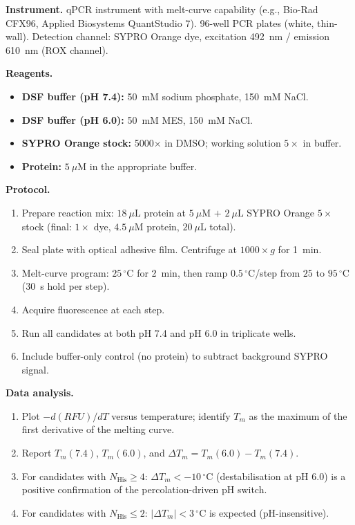 \noindent\textbf{Instrument.}  qPCR instrument with melt-curve capability
(e.g., Bio-Rad CFX96, Applied Biosystems QuantStudio 7).  96-well PCR plates
(white, thin-wall).  Detection channel: SYPRO Orange dye, excitation
492~nm / emission 610~nm (ROX channel).

\noindent\textbf{Reagents.}
\begin{itemize}[leftmargin=1.2cm]
  \item \textbf{DSF buffer (pH 7.4):} 50~mM sodium phosphate, 150~mM NaCl.
  \item \textbf{DSF buffer (pH 6.0):} 50~mM MES, 150~mM NaCl.
  \item \textbf{SYPRO Orange stock:} 5000$\times$ in DMSO; working solution
        $5\times$ in buffer.
  \item \textbf{Protein:} $5~\mu\mathrm{M}$ in the appropriate buffer.
\end{itemize}

\noindent\textbf{Protocol.}
\begin{enumerate}[leftmargin=1.5cm, label=\arabic*.]
  \item Prepare reaction mix: $18~\mu\mathrm{L}$ protein at $5~\mu\mathrm{M}$
        $+$ $2~\mu\mathrm{L}$ SYPRO Orange $5\times$ stock (final: $1\times$
        dye, $4.5~\mu\mathrm{M}$ protein, $20~\mu\mathrm{L}$ total).
  \item Seal plate with optical adhesive film.  Centrifuge at $1000 \times g$
        for 1~min.
  \item Melt-curve program: $25\,^\circ\mathrm{C}$ for 2~min, then ramp
        $0.5\,^\circ\mathrm{C}$/step from $25$ to $95\,^\circ\mathrm{C}$
        (30~s hold per step).
  \item Acquire fluorescence at each step.
  \item Run all candidates at both pH 7.4 and pH 6.0 in triplicate wells.
  \item Include buffer-only control (no protein) to subtract background
        SYPRO signal.
\end{enumerate}

\noindent\textbf{Data analysis.}
\begin{enumerate}[leftmargin=1.5cm, label=\arabic*.]
  \item Plot $-d(RFU)/dT$ versus temperature; identify $T_m$ as the maximum
        of the first derivative of the melting curve.
  \item Report $T_m(7.4)$, $T_m(6.0)$, and $\Delta T_m = T_m(6.0) -
        T_m(7.4)$.
  \item For candidates with $N_{\text{His}} \ge 4$: $\Delta T_m < -10\,
        ^\circ\mathrm{C}$ (destabilisation at pH 6.0) is a positive
        confirmation of the percolation-driven pH switch.
  \item For candidates with $N_{\text{His}} \le 2$: $|\Delta T_m| < 3\,
        ^\circ\mathrm{C}$ is expected (pH-insensitive).
\end{enumerate}

